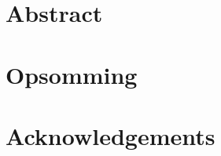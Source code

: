 \TitlePage

\DeclarationPage

\chapter{Abstract}
\newpage

\chapter{Opsomming}
\newpage

\chapter{Acknowledgements}
\newpage

\setcounter{secnumdepth}{4}
\setcounter{tocdepth}{4}

\tableofcontents
\newpage

\listoffigures
\newpage

\listoftables
\newpage